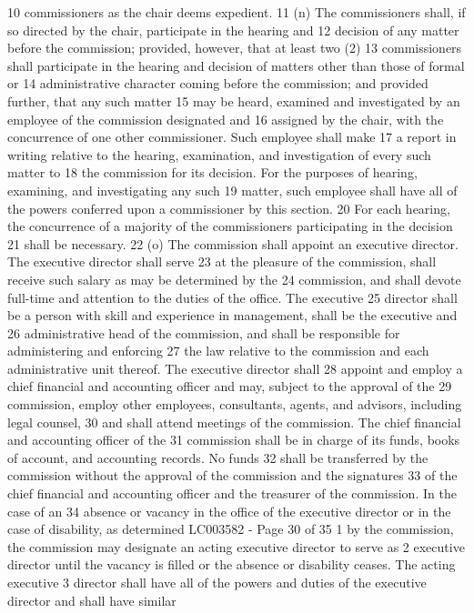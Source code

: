 10 commissioners as the chair deems expedient.
11 (n) The commissioners shall, if so directed by the chair, participate in the hearing and
12 decision of any matter before the commission; provided, however, that at least two (2)
13 commissioners shall participate in the hearing and decision of matters other than those of formal or
14 administrative character coming before the commission; and provided further, that any such matter
15 may be heard, examined and investigated by an employee of the commission designated and
16 assigned by the chair, with the concurrence of one other commissioner. Such employee shall make
17 a report in writing relative to the hearing, examination, and investigation of every such matter to
18 the commission for its decision. For the purposes of hearing, examining, and investigating any such
19 matter, such employee shall have all of the powers conferred upon a commissioner by this section.
20 For each hearing, the concurrence of a majority of the commissioners participating in the decision
21 shall be necessary.
22 (o) The commission shall appoint an executive director. The executive director shall serve
23 at the pleasure of the commission, shall receive such salary as may be determined by the
24 commission, and shall devote full-time and attention to the duties of the office. The executive
25 director shall be a person with skill and experience in management, shall be the executive and
26 administrative head of the commission, and shall be responsible for administering and enforcing
27 the law relative to the commission and each administrative unit thereof. The executive director shall
28 appoint and employ a chief financial and accounting officer and may, subject to the approval of the
29 commission, employ other employees, consultants, agents, and advisors, including legal counsel,
30 and shall attend meetings of the commission. The chief financial and accounting officer of the
31 commission shall be in charge of its funds, books of account, and accounting records. No funds
32 shall be transferred by the commission without the approval of the commission and the signatures
33 of the chief financial and accounting officer and the treasurer of the commission. In the case of an
34 absence or vacancy in the office of the executive director or in the case of disability, as determined 
LC003582 - Page 30 of 35
1 by the commission, the commission may designate an acting executive director to serve as
2 executive director until the vacancy is filled or the absence or disability ceases. The acting executive
3 director shall have all of the powers and duties of the executive director and shall have similar
